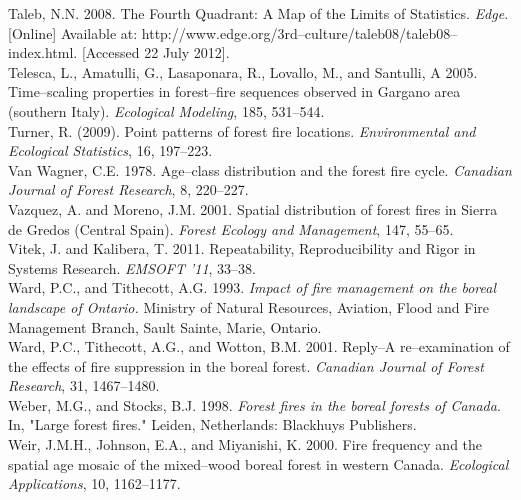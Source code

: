 \begin{spacing}{1.5}
\noindent Taleb, N.N. 2008. The Fourth Quadrant: A Map of the Limits of Statistics. \emph{Edge}. [Online] Available at: http://www.edge.org/3rd--culture/taleb08/taleb08--index.html. [Accessed 22 July 2012]. \\

\noindent Telesca, L., Amatulli, G., Lasaponara, R., Lovallo, M., and Santulli, A 2005. Time--scaling properties in forest--fire sequences observed in Gargano area (southern Italy). \emph{Ecological Modeling}, 185, 531--544.\\

\noindent Turner, R. (2009). Point patterns of forest fire locations. \emph{Environmental and Ecological Statistics}, 16, 197--223.\\

\noindent Van Wagner, C.E. 1978. Age--class distribution and the forest fire cycle. \emph{Canadian Journal of Forest Research}, 8, 220--227.\\

\noindent Vazquez, A. and Moreno, J.M. 2001. Spatial distribution of forest fires in Sierra de Gredos (Central Spain). \emph{Forest Ecology and Management}, 147, 55--65.\\

\noindent Vitek, J. and Kalibera, T. 2011. Repeatability, Reproducibility and Rigor in Systems Research. \emph{EMSOFT '11}, 33--38.\\

\noindent Ward, P.C., and Tithecott, A.G. 1993. \emph{Impact of fire management on the boreal landscape of Ontario.} Ministry of Natural Resources, Aviation, Flood and Fire Management Branch, Sault Sainte, Marie, Ontario.\\

\noindent Ward, P.C., Tithecott, A.G., and Wotton, B.M. 2001. Reply--A re--examination of the effects of fire suppression in the boreal forest. \emph{Canadian Journal of Forest Research}, 31, 1467--1480.\\

\noindent Weber, M.G., and Stocks, B.J. 1998. \emph{Forest fires in the boreal forests of Canada}. In, "Large forest fires." Leiden, Netherlands: Blackhuys Publishers.\\

\noindent Weir, J.M.H., Johnson, E.A., and Miyanishi, K. 2000. Fire frequency and the spatial age mosaic of the mixed--wood boreal forest in western Canada. \emph{Ecological Applications}, 10, 1162--1177.\\
\end{spacing}
\clearpage
